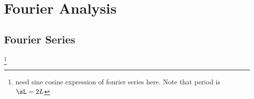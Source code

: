 \chapter{Fourier Analysis}


%
%
%
%
%



\section{Fourier Series}


\footnote{need sine cosine expression of fourier series here. Note that period is $\sL = 2L$}

